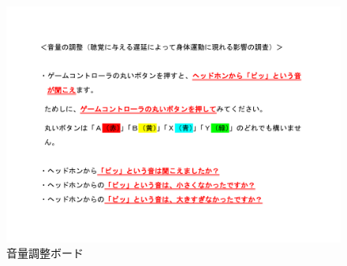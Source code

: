 \begin{figure}[ht]
  \centering
  \includegraphics[scale=0.4]{furoku_A/Onnryou.pdf}
  \caption{音量調整ボード}
\end{figure}
